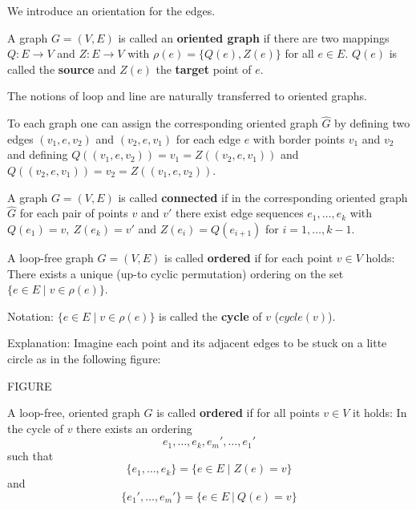 We introduce an orientation for the edges. 

\begin{definition}
A graph $G = (V,E)$ is called an {\bf oriented graph} if there are two mappings
$Q : E \to V$ and $Z : E \to V$ with $\rho(e) = \{Q(e), Z(e)\}$ for all $e \in
E$.
$Q(e)$ is called the {\bf source} and $Z(e)$ the {\bf target} point of $e$.
\end{definition}


The notions of loop and line are naturally transferred to oriented graphs.

To each graph one can assign the corresponding oriented graph $\hat{G}$ by
defining two edges $(v_1,e,v_2)$ and $(v_2,e,v_1)$ for each edge $e$ with
border points $v_1$ and $v_2$ and defining $Q((v_1,e,v_2)) = v_1 =
Z((v_2,e,v_1))$ and $Q((v_2,e,v_1)) = v_2 = Z((v_1,e,v_2))$.

\begin{definition}
A graph $G = (V,E)$ is called {\bf connected} if in the corresponding oriented
graph $\hat{G}$ for each pair of points $v$ and $v'$ there exist edge sequences
$e_1, \ldots, e_k$ with $Q(e_1) = v,\ Z(e_k) = v'$ and $Z(e_i) = Q(e_{i+1})$ for
$i = 1, \ldots, k-1$.
\end{definition}

\begin{definition}
A loop-free graph $G = (V,E)$ is called {\bf ordered} if for each point $v \in
V$ holds: There exists a unique (up-to cyclic permutation) ordering on the set
$\{ e \in E  \mid v \in \rho(e) \}$.
\end{definition}

Notation: $\{ e \in E \mid v \in \rho(e) \}$ is called the {\bf cycle} of $v$
($cycle(v)$).

Explanation: Imagine each point and its adjacent edges to be stuck on a litte
circle as in the following figure:

FIGURE

\begin{definition}
A loop-free, oriented graph $G$ is called {\bf ordered} if for all points
$v \in V$ it	holds: In the cycle of $v$ there exists an ordering 
\[ e_1, \ldots, e_k, e_m', \ldots, e_1'\]
such that
\[ \{ e_1, \ldots, e_k \} = \{ e \in E \mid Z(e) = v \} \]
and 
\[ \{ e_1', \ldots, e_m' \} = \{ e \in E\ |\ Q(e) = v \} \]
\end{definition}

